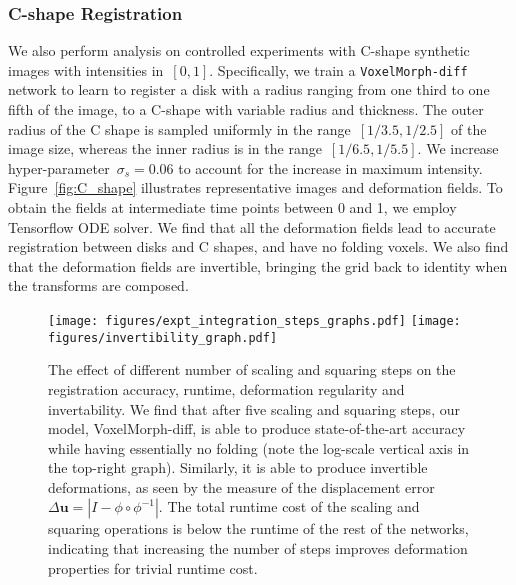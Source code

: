 \documentclass{article}
\newcommand{\bu}{\boldsymbol{u}}
\begin{document}
{\color{blue} 
	\subsubsection{C-shape Registration}
	We also perform analysis on controlled experiments with C-shape synthetic images with intensities in~$[0,1]$. Specifically, we train a \verb|VoxelMorph-diff| network to learn to register a disk with a radius ranging from one third to one fifth of the image, to a C-shape with variable radius and thickness. The outer radius of the C shape is sampled uniformly in the range~$[1/3.5, 1/2.5]$ of the image size, whereas the inner radius is in the range~$[1/6.5, 1/5.5]$. We increase hyper-parameter~$\sigma_s = 0.06$ to account for the increase in maximum intensity. Figure~\ref{fig:C_shape} illustrates representative images and deformation fields. To obtain the fields at intermediate time points between 0 and 1, we employ Tensorflow ODE solver. We find that all the deformation fields lead to accurate registration between disks and C shapes, and have no folding voxels. We also find that the deformation fields are invertible, bringing the grid back to identity when the transforms are composed. }











\begin{figure}[t!]
	\begin{center}
		\texttt{[image: figures/expt\_integration\_steps\_graphs.pdf]}
		\texttt{[image: figures/invertibility\_graph.pdf]}
	\end{center}
	\caption{The effect of different number of scaling and squaring steps on the registration accuracy, runtime, deformation regularity and invertability. We find that after five scaling and squaring steps, our model, VoxelMorph-diff, is able to produce state-of-the-art accuracy while having essentially no folding (note the log-scale vertical axis in the top-right graph). Similarly, it is able to produce invertible deformations, as seen by the measure of the displacement error~$\Delta \bu = |I - \phi \circ \phi^{-1}|$. The total runtime cost of the scaling and squaring operations is below the runtime of the rest of the networks, indicating that increasing the number of steps improves deformation properties for trivial runtime cost.}
	\label{fig:expt_integration_steps}
\end{figure}
\end{document}

